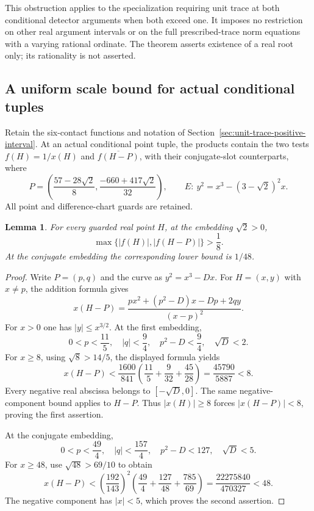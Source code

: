 \documentclass[11pt,a4paper]{article}
\newtheorem{lemma}[theorem]{Lemma}
\begin{document}
This obstruction applies to the specialization requiring unit trace
at both conditional detector arguments when both exceed one.
It imposes no restriction on other real argument intervals or on
the full prescribed-trace norm equations with a varying rational
ordinate. The theorem asserts existence of a real root only;
its rationality is not asserted.

\subsection{A uniform scale bound for actual conditional tuples}

Retain the six-contact functions and notation of
Section~\ref{sec:unit-trace-positive-interval}. At an actual conditional
point tuple, the products contain the two tests
$f(H)=1/x(H)$ and $\overline{f(H-P)}$, with their conjugate-slot
counterparts, where
\[
 P=\left(\frac{57-28\sqrt2}{8},
          \frac{-660+417\sqrt2}{32}\right),\qquad
 E:\ y^2=x^3-(3-\sqrt2)^2x.
\]
All point and difference-chart guards are retained.

\begin{lemma}\label{lem:reference-real-separation}
For every guarded real point $H$, at the embedding $\sqrt2>0$,
\[
 \max\{|f(H)|,|f(H-P)|\}>\frac18.
\]
At the conjugate embedding the corresponding lower bound is $1/48$.
\end{lemma}
\begin{proof}
Write $P=(p,q)$ and the curve as $y^2=x^3-Dx$. For $H=(x,y)$
with $x\ne p$, the addition formula gives
\[
 x(H-P)=
 \frac{px^2+(p^2-D)x-Dp+2qy}{(x-p)^2}.
\]
For $x>0$ one has $|y|\le x^{3/2}$. At the first embedding,
\[
 0<p<\frac{11}{5},\quad |q|<\frac94,\quad
 p^2-D<\frac94,\quad \sqrt D<2.
\]
For $x\ge8$, using $\sqrt8>14/5$, the displayed formula yields
\[
 x(H-P)<\frac{1600}{841}
       \left(\frac{11}{5}+\frac9{32}+\frac{45}{28}\right)
       =\frac{45790}{5887}<8.
\]
Every negative real abscissa belongs to $[-\sqrt D,0]$.
The same negative-component bound applies to $H-P$. Thus
$|x(H)|\ge8$ forces $|x(H-P)|<8$, proving the first assertion.

At the conjugate embedding,
\[
 0<p<\frac{49}{4},\quad |q|<\frac{157}{4},\quad
 p^2-D<127,\quad\sqrt D<5.
\]
For $x\ge48$, use $\sqrt{48}>69/10$ to obtain
\[
 x(H-P)<\left(\frac{192}{143}\right)^2
   \left(\frac{49}{4}+\frac{127}{48}+\frac{785}{69}\right)
   =\frac{22275840}{470327}<48.
\]
The negative component has $|x|<5$, which proves the second assertion.
\end{proof}
\end{document}

